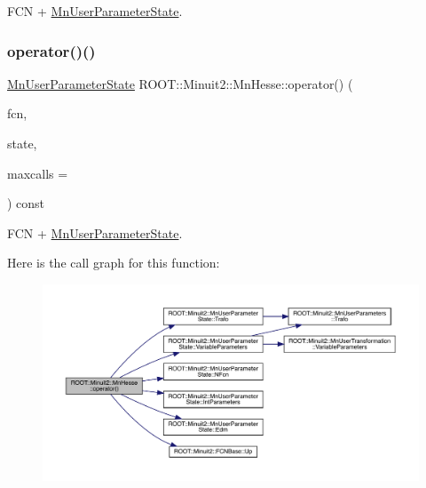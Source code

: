 F\+CN + \mbox{\hyperlink{classROOT_1_1Minuit2_1_1MnUserParameterState}{Mn\+User\+Parameter\+State}}. 

\mbox{\label{classROOT_1_1Minuit2_1_1MnHesse_a4ebea568262a19a0cfec1473ce7a5f0f}} 
\subsubsection{\texorpdfstring{operator()()}{operator()()}\hspace{0.1cm}{\footnotesize\ttfamily [18/24]}}
{\footnotesize\ttfamily \mbox{\hyperlink{classROOT_1_1Minuit2_1_1MnUserParameterState}{Mn\+User\+Parameter\+State}} R\+O\+O\+T\+::\+Minuit2\+::\+Mn\+Hesse\+::operator() (\begin{DoxyParamCaption}\item[{const \mbox{\hyperlink{classROOT_1_1Minuit2_1_1FCNBase}{F\+C\+N\+Base}} \&}]{fcn,  }\item[{const \mbox{\hyperlink{classROOT_1_1Minuit2_1_1MnUserParameterState}{Mn\+User\+Parameter\+State}} \&}]{state,  }\item[{unsigned int}]{maxcalls = {} }\end{DoxyParamCaption}) const}



F\+CN + \mbox{\hyperlink{classROOT_1_1Minuit2_1_1MnUserParameterState}{Mn\+User\+Parameter\+State}}. 

Here is the call graph for this function\+:
\nopagebreak
\begin{figure}[H]
\begin{center}
\leavevmode
\includegraphics[width=350pt]{d1/d02/classROOT_1_1Minuit2_1_1MnHesse_a4ebea568262a19a0cfec1473ce7a5f0f_cgraph}
\end{center}
\end{figure}
\mbox{\label{classROOT_1_1Minuit2_1_1MnHesse_a3b6ba68a41260029bc6bde433170e600}} 
